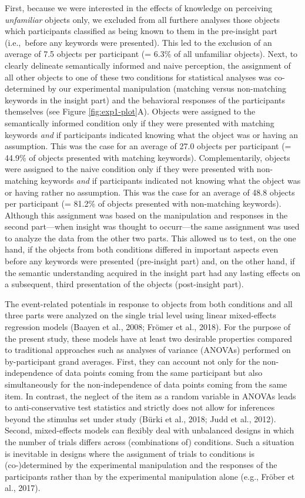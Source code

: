 \documentclass[
  english,
  man,12pt,twoside]{apa7}
\begin{document}
First, because we were interested in the effects of knowledge on perceiving \emph{unfamiliar} objects only, we excluded from all furthere analyses those objects which participants classified as being known to them in the pre-insight part (i.e.,~before any keywords were presented). This led to the exclusion of an average of 7.5 objects per participant (= 6.3\% of all unfamiliar objects). Next, to clearly delineate semantically informed and naive perception, the assignment of all other objects to one of these two conditions for statistical analyses was co-determined by our experimental manipulation (matching versus non-matching keywords in the insight part) and the behavioral responses of the participants themselves (see Figure \ref{fig:exp1-plot}A). Objects were assigned to the semantically informed condition only if they were presented with matching keywords \emph{and} if participants indicated knowing what the object was or having an assumption. This was the case for an average of 27.0 objects per participant (= 44.9\% of objects presented with matching keywords). Complementarily, objects were assigned to the naive condition only if they were presented with non-matching keywords \emph{and} if participants indicated not knowing what the object was or having rather no assumption. This was the case for an average of 48.8 objects per participant (= 81.2\% of objects presented with non-matching keywords). Although this assignment was based on the manipulation and responses in the second part---when insight was thought to occurr---the same assignment was used to analyze the data from the other two parts. This allowed us to test, on the one hand, if the objects from both conditions differed in important aspects even before any keywords were presented (pre-insight part) and, on the other hand, if the semantic understanding acquired in the insight part had any lasting effects on a subsequent, third presentation of the objects (post-insight part).

The event-related potentials in response to objects from both conditions and all three parts were analyzed on the single trial level using linear mixed-effects regression models (Baayen et al., 2008; Frömer et al., 2018). For the purpose of the present study, these models have at least two desirable properties compared to traditional approaches such as analyses of variance (ANOVAs) performed on by-participant grand averages. First, they can account not only for the non-independence of data points coming from the same participant but also simultaneously for the non-independence of data points coming from the same item. In contrast, the neglect of the item as a random variable in ANOVAs leads to anti-conservative test statistics and strictly does not allow for inferences beyond the stimulus set under study (Bürki et al., 2018; Judd et al., 2012). Second, mixed-effects models can flexibly deal with unbalanced designs in which the number of trials differs across (combinations of) conditions. Such a situation is inevitable in designs where the assignment of trials to conditions is (co-)determined by the experimental manipulation and the responses of the participants rather than by the experimental manipulation alone (e.g., Fröber et al., 2017).
\end{document}
